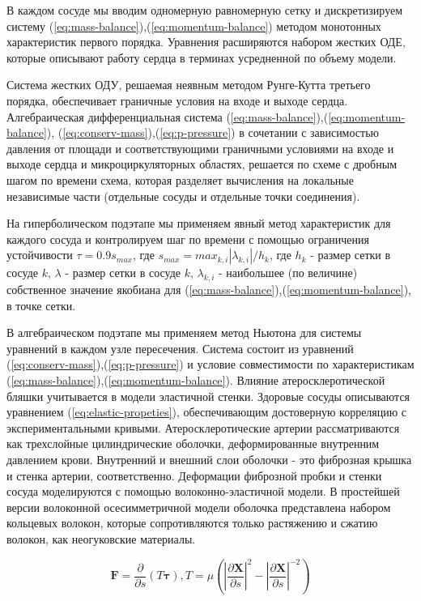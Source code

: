 В каждом сосуде мы вводим одномерную равномерную сетку и дискретизируем систему (\ref{eq:mass-balance}),(\ref{eq:momentum-balance}) методом монотонных характеристик первого порядка. Уравнения расширяются набором жестких ОДЕ, которые описывают работу сердца в терминах усредненной по объему модели.

Система жестких ОДУ, решаемая неявным методом Рунге-Кутта третьего порядка, обеспечивает граничные условия на входе и выходе сердца. Алгебраическая дифференциальная система (\ref{eq:mass-balance}),(\ref{eq:momentum-balance}), (\ref{eq:conserv-mass}),(\ref{eq:p-pressure}) в сочетании с зависимостью давления от площади и соответствующими граничными условиями на входе и выходе сердца и микроциркуляторных областях, решается по схеме с дробным шагом по времени схема, которая разделяет вычисления на локальные независимые части (отдельные сосуды и отдельные точки соединения).

На гиперболическом подэтапе мы применяем явный метод характеристик для каждого сосуда и контролируем шаг по времени с помощью ограничения устойчивости $\tau = 0.9 s_{max}$, где $s_{max}=max_{k,i}|\lambda _{k,i}|/h_k$, где $h_k$ - размер сетки в сосуде $k$, $\lambda$ - размер сетки в сосуде $k$,  $\lambda _{k,i}$ - наибольшее (по величине) собственное значение якобиана для  (\ref{eq:mass-balance}),(\ref{eq:momentum-balance}),  в точке сетки.

В алгебраическом подэтапе мы применяем метод Ньютона для системы уравнений в каждом узле пересечения. Система состоит из уравнений (\ref{eq:conserv-mass}),(\ref{eq:p-pressure}) и условие совместимости по характеристикам (\ref{eq:mass-balance}),(\ref{eq:momentum-balance}). Влияние атеросклеротической бляшки учитывается в модели эластичной стенки. Здоровые сосуды описываются уравнением (\ref{eq:elastic-propeties}), обеспечивающим достоверную корреляцию с экспериментальными кривыми. Атеросклеротические артерии рассматриваются как трехслойные цилиндрические оболочки, деформированные внутренним давлением крови. Внутренний и внешний слои оболочки - это фиброзная крышка и стенка артерии, соответственно. Деформации фиброзной пробки и стенки сосуда моделируются с помощью волоконно-эластичной модели. В простейшей версии волоконной осесимметричной модели оболочка представлена набором кольцевых волокон, которые сопротивляются только растяжению и сжатию волокон, как неогуковские материалы.

\begin{equation}
    \label{loc-force}
    \mathbf{F}=\frac{\partial}{\partial s}(T\mathbf{\tau}),
    T=\mu\left(\left|\frac{\partial \mathbf{X}}{\partial s}\right|^2-\left|\frac{\partial \mathbf{X}}{\partial s}\right|^{-2}\right)
\end{equation}


